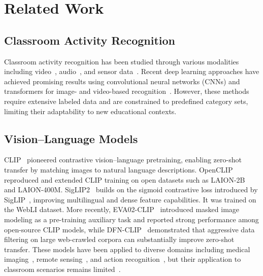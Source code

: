 \documentclass[symmetry,article,submit,pdftex,moreauthors]{Definitions/mdpi}
\begin{document}
\section{Related Work}
\label{sec:related}

\subsection{Classroom Activity Recognition}

Classroom activity recognition has been studied through various modalities including video~\cite{whitehill2014automated}, audio~\cite{donnelly2017automatic}, and sensor data~\cite{dillenbourg2011classroom}.
Recent deep learning approaches have achieved promising results using convolutional neural networks (CNNs) and transformers for image- and video-based recognition~\cite{zhang2020classroom_cnn,li2022classroom_transformer}.
However, these methods require extensive labeled data and are constrained to predefined category sets, limiting their adaptability to new educational contexts.

\subsection{Vision--Language Models}

CLIP~\cite{radford2021learning} pioneered contrastive vision--language pretraining, enabling zero-shot transfer by matching images to natural language descriptions.
OpenCLIP~\cite{cherti2023reproducible} reproduced and extended CLIP training on open datasets such as LAION-2B~\cite{schuhmann2022laion5b} and LAION-400M.
SigLIP2~\cite{tschannen2025siglip2} builds on the sigmoid contrastive loss introduced by SigLIP~\cite{zhai2023sigmoid}, improving multilingual and dense feature capabilities. It was trained on the WebLI dataset.
More recently, EVA02-CLIP~\cite{sun2023eva02} introduced masked image modeling as a pre-training auxiliary task and reported strong performance among open-source CLIP models, while DFN-CLIP~\cite{fang2023data} demonstrated that aggressive data filtering on large web-crawled corpora can substantially improve zero-shot transfer.
These models have been applied to diverse domains including medical imaging~\cite{wang2022medclip}, remote sensing~\cite{liu2024remoteclip}, and action recognition~\cite{wang2021actionclip}, but their application to classroom scenarios remains limited~\cite{zhou2025security_llm}.
\end{document}
